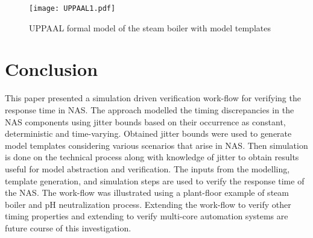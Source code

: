 \documentclass[letterpaper, 10 pt, conference]{ieeeconf}
\begin{document}
\begin{figure}[h]
\centering
\texttt{[image: UPPAAL1.pdf]}
\caption{UPPAAL formal model of the steam boiler with model templates}
\label{Fig:result1}
\end{figure}











\section{Conclusion}
This paper presented a simulation driven verification work-flow for verifying the response time in NAS. The approach modelled the timing discrepancies in the NAS components using jitter bounds based on their occurrence as constant, deterministic and time-varying. Obtained jitter bounds were used to generate model templates considering various scenarios that arise in NAS. Then simulation is done on the technical process along with knowledge of jitter to obtain results useful for model abstraction and verification. The inputs from the modelling, template generation, and simulation steps are used to verify the response time of the NAS. The work-flow was illustrated using a plant-floor example of steam boiler and pH neutralization process. Extending the work-flow to verify other timing properties and extending to verify multi-core automation systems are future course of this investigation.
\end{document}
